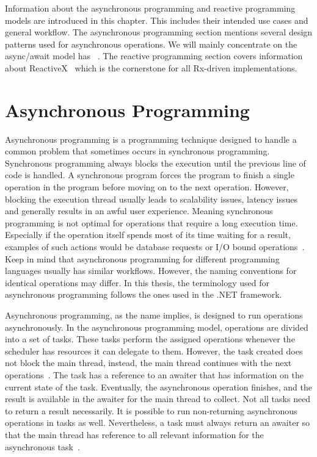 Information about the asynchronous programming and reactive programming models are introduced in this chapter. This includes their intended use cases and general workflow. The asynchronous programming section mentions several design patterns used for asynchronous operations. We will mainly concentrate on the async/await model has ~\cite{DOC:AsyncAwait}. The reactive programming section covers information about ReactiveX~\cite{WEB:ReactiveXMainPage} which is the cornerstone for all Rx-driven implementations.
\section{Asynchronous Programming}
\label{section:AsyncProgramming}
Asynchronous programming is a programming technique designed to handle a common problem that sometimes occurs in synchronous programming. Synchronous programming always blocks the execution until the previous line of code is handled. A synchronous program forces the program to finish a single operation in the program before moving on to the next operation. However, blocking the execution thread usually leads to scalability issues, latency issues and generally results in an awful user experience. Meaning synchronous programming is not optimal for operations that require a long execution time. Especially if the operation itself spends most of its time waiting for a result, examples of such actions would be database requests or I/O bound operations~\cite{VIDEO:AsyncConBack, WEB:AsyncAwaitTut}. Keep in mind that asynchronous programming for different programming languages usually has similar workflows. However, the naming conventions for identical operations may differ. In this thesis, the terminology used for asynchronous programming follows the ones used in the .NET framework.

Asynchronous programming, as the name implies, is designed to run operations asynchronously. In the asynchronous programming model, operations are divided into a set of tasks. These tasks perform the assigned operations whenever the scheduler has resources it can delegate to them.
However, the task created does not block the main thread, instead, the main thread continues with the next operations~\cite{WEB:AsyncAwaitTut, VIDEO:AsyncConBack, DOC:AsyncAwait}.
The task has a reference to an awaiter that has information on the current state of the task. Eventually, the asynchronous operation finishes, and the result is available in the awaiter for the main thread to collect. Not all tasks need to return a result necessarily. It is possible to run non-returning asynchronous operations in tasks as well. Nevertheless, a task must always return an awaiter so that the main thread has reference to all relevant information for the asynchronous task~\cite{WEB:AsyncAwaitTut}.

